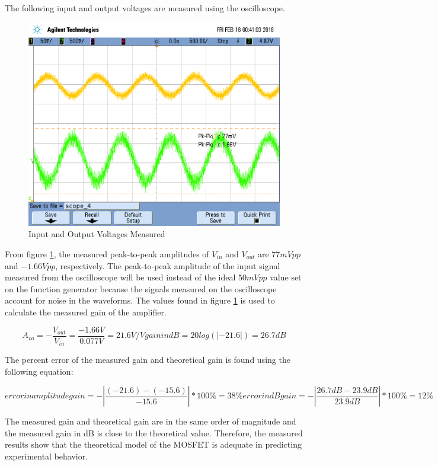 \FloatBarrier

The following input and output voltages are measured using the oscilloscope.

\FloatBarrier

\begin{figure}[h!]
	\centering
		\includegraphics[scale=1]{../img/scope_4.png}
		\caption{Input and Output Voltages Measured}
		\label{fig:measured_vin_vout}
\end{figure}

\FloatBarrier

From figure \ref{fig:measured_vin_vout}, the measured peak-to-peak amplitudes of $V_{in}$ and $V_{out}$ are $77 mVpp$ and $-1.66 Vpp$, respectively.
The peak-to-peak amplitude of the input signal measured from the oscilloscope will be used instead of the ideal $50 mVpp$ value set on the function generator because the signals measured on the oscilloscope account for noise in the waveforms.
The values found in figure \ref{fig:measured_vin_vout} is used to calculate the measured gain of the amplifier.

\FloatBarrier

\begin{equation}
	\label{eq:measured_gain}
	A_{vo} = - \frac{V_{out}}{V_{in}} = \frac{-1.66 V}{0.077 V} = 21.6 V/V
    gain in dB = 20 log(|-21.6|) = 26.7 dB
\end{equation}

\FloatBarrier

The percent error of the measured gain and theoretical gain is found using the following equation:

\begin{equation}
	\label{eq:error}
	error in amplitude gain = - |\frac{(-21.6) - (-15.6)}{-15.6}| * 100\% = 38\%
    error in dB gain = - |\frac{26.7 dB - 23.9 dB}{23.9 dB}| * 100\% = 12\%
\end{equation}

 The measured gain and theoretical gain are in the same order of magnitude and the measured gain in dB is close to the theoretical value.
 Therefore, the measured results show that the theoretical model of the MOSFET is adequate in predicting experimental behavior.
